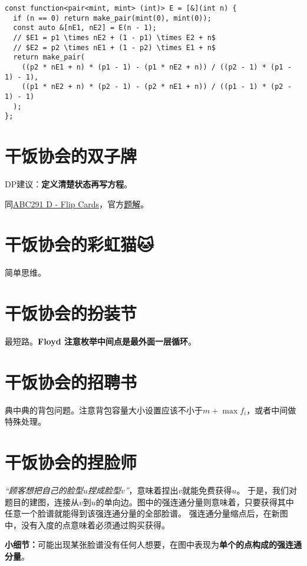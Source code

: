 \documentclass[11pt, UTF8]{ctexart}
\theoremstyle{mystyle} %
\begin{document}
\begin{verbatim}
const function<pair<mint, mint> (int)> E = [&](int n) {
  if (n == 0) return make_pair(mint(0), mint(0));
  const auto &[nE1, nE2] = E(n - 1);
  // $E1 = p1 \times nE2 + (1 - p1) \times E2 + n$
  // $E2 = p2 \times nE1 + (1 - p2) \times E1 + n$
  return make_pair(
    ((p2 * nE1 + n) * (p1 - 1) - (p1 * nE2 + n)) / ((p2 - 1) * (p1 - 1) - 1),
    ((p1 * nE2 + n) * (p2 - 1) - (p2 * nE1 + n)) / ((p1 - 1) * (p2 - 1) - 1)
  );
};
\end{verbatim}

\section{干饭协会的双子牌{\EmojiFont 🎴}}

DP建议：\textbf{定义清楚状态再写方程}。\par
同\href{https://atcoder.jp/contests/abc291/tasks/abc291_d}{ABC291 D - Flip Cards}，官方\href{https://atcoder.jp/contests/abc291/editorial/5861}{题解}。

\section{干饭协会的彩虹猫{\EmojiFont 🐱}}

简单思维。

\section{干饭协会的扮装节{\EmojiFont 🎩}}

最短路。\textbf{Floyd 注意枚举中间点是最外面一层循环}。

\section{干饭协会的招聘书{\EmojiFont 📕}}

典中典的背包问题。注意背包容量大小设置应该不小于$m+\max{f_i}$，或者中间做特殊处理。

\section{干饭协会的捏脸师{\EmojiFont 👩‍🦰}}

\textit{“顾客想把自己的脸型$u$捏成脸型$v$”}，意味着捏出$v$就能免费获得$u$。
于是，我们对题目的建图，连接从$v$到$u$的单向边。图中的强连通分量则意味着，只要获得其中任意一个脸谱就能得到该强连通分量的全部脸谱。
强连通分量缩点后，在新图中，没有入度的点意味着必须通过购买获得。\par
\textbf{小细节：}可能出现某张脸谱没有任何人想要，在图中表现为\textbf{单个的点构成的强连通分量}。
\end{document}
